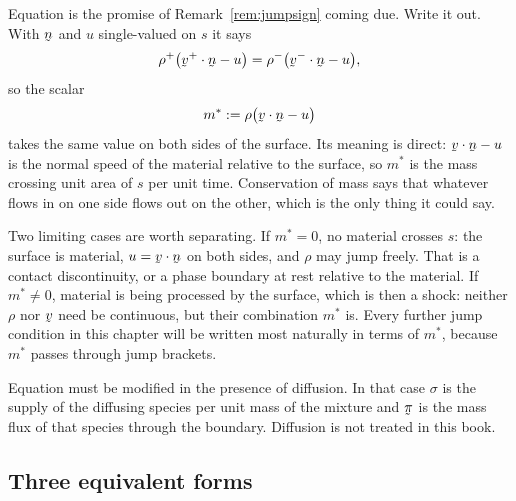 \begin{remark}\label{rem:ch6rh1}
Equation  is the promise of Remark~\ref{rem:jumpsign} coming
due. Write it out. With $\bn$ and $u$ single-valued on $s$ it says
\[
   \rho^{+}\big(\ip{\bv^{+}}\bn-u\big)
   =\rho^{-}\big(\ip{\bv^{-}}\bn-u\big),
\]
so the scalar
\[
   m^{*}:=\rho\big(\ip\bv\bn-u\big)
\]
takes the same value on both sides of the surface. Its meaning is
direct: $\ip\bv\bn-u$ is the normal speed of the material relative to
the surface, so $m^{*}$ is the mass crossing unit area of $s$ per unit
time. Conservation of mass says that whatever flows in on one side
flows out on the other, which is the only thing it could say.

Two limiting cases are worth separating. If $m^{*}=0$, no material
crosses $s$: the surface is material, $u=\ip\bv\bn$ on both sides, and
$\rho$ may jump freely. That is a contact discontinuity, or a phase
boundary at rest relative to the material. If $m^{*}\neq0$, material is
being processed by the surface, which is then a shock: neither $\rho$
nor $\bv$ need be continuous, but their combination $m^{*}$ is. Every
further jump condition in this chapter will be written most naturally
in terms of $m^{*}$, because $m^{*}$ passes through jump brackets.
\end{remark}

Equation  must be modified in the presence of diffusion. In
that case $\sigma$ is the supply of the diffusing species per unit mass
of the mixture and $\vek\pi$ is the mass flux of that species through
the boundary. Diffusion is not treated in this book.

\subsection*{Three equivalent forms}

